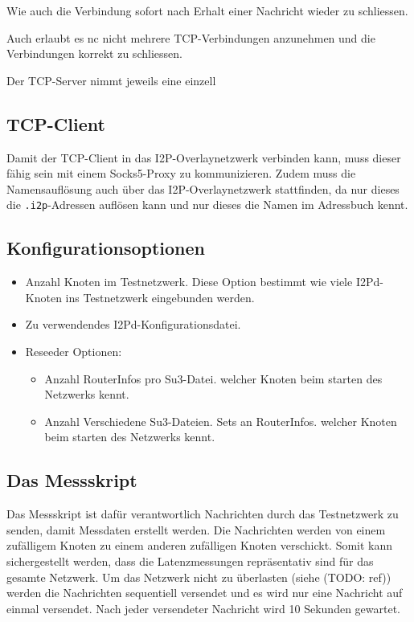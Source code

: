 Wie auch die Verbindung sofort nach Erhalt einer Nachricht wieder zu schliessen.

Auch erlaubt es nc nicht mehrere TCP-Verbindungen anzunehmen und die Verbindungen korrekt zu schliessen.

Der TCP-Server nimmt jeweils eine einzell


\subsection{TCP-Client}

Damit der TCP-Client in das I2P-Overlaynetzwerk verbinden kann, muss dieser fähig sein mit einem Socks5-Proxy zu kommunizieren.
Zudem muss die Namensauflösung auch über das I2P-Overlaynetzwerk stattfinden, da nur dieses die \lstinline|.i2p|-Adressen auflösen kann und nur dieses die Namen im Adressbuch kennt.


\subsection{Konfigurationsoptionen}

\begin{itemize}
    \item Anzahl Knoten im Testnetzwerk. Diese Option bestimmt wie viele I2Pd-Knoten ins Testnetzwerk eingebunden werden.
    \item Zu verwendendes I2Pd-Konfigurationsdatei.
    \item Reseeder Optionen:
        \begin{itemize}
        \item Anzahl RouterInfos pro Su3-Datei. welcher Knoten beim starten des Netzwerks kennt.
        \item Anzahl Verschiedene Su3-Dateien. Sets an RouterInfos. welcher Knoten beim starten des Netzwerks kennt.
        \end{itemize}
\end{itemize}

\subsection{Das Messskript}\label{sec:messskript}

Das Messskript ist dafür verantwortlich Nachrichten durch das Testnetzwerk zu senden, damit Messdaten erstellt werden.
Die Nachrichten werden von einem zufälligem Knoten zu einem anderen zufälligen Knoten verschickt.
Somit kann sichergestellt werden, dass die Latenzmessungen repräsentativ sind für das gesamte Netzwerk.
Um das Netzwerk nicht zu überlasten (siehe (TODO: ref)) werden die Nachrichten sequentiell versendet und es wird nur eine Nachricht auf einmal versendet.
Nach jeder versendeter Nachricht wird 10 Sekunden gewartet.

